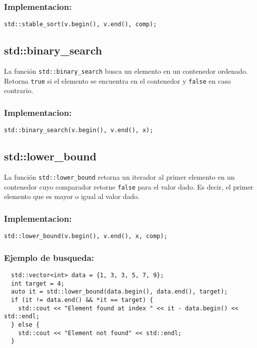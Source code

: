 \subsubsection*{Implementacion:}
\begin{lstlisting}
std::stable_sort(v.begin(), v.end(), comp);
\end{lstlisting}

\subsection{std::binary\_search}
\label{subsec:std_binary_search}
La función \texttt{std::binary\_search} busca un elemento en un contenedor ordenado. Retorna \texttt{true} si el elemento se encuentra en el contenedor y \texttt{false} en caso contrario.

\subsubsection*{Implementacion:}
\begin{lstlisting}
std::binary_search(v.begin(), v.end(), x);
\end{lstlisting}

\subsection{std::lower\_bound}
\label{subsec:std_lower_bound}
La función \texttt{std::lower\_bound} retorna un iterador al primer elemento en un contenedor cuyo comparador retorne \texttt{false} para el valor dado. Es decir, el primer elemento que es mayor o igual al valor dado.

\subsubsection*{Implementacion:}
\begin{lstlisting}
std::lower_bound(v.begin(), v.end(), x, comp);
\end{lstlisting}

\subsubsection*{Ejemplo de busqueda:}
\begin{lstlisting}
  std::vector<int> data = {1, 3, 3, 5, 7, 9};
  int target = 4;
  auto it = std::lower_bound(data.begin(), data.end(), target);
  if (it != data.end() && *it == target) {
    std::cout << "Element found at index " << it - data.begin() << std::endl;
  } else {
    std::cout << "Element not found" << std::endl;
  }
\end{lstlisting}


